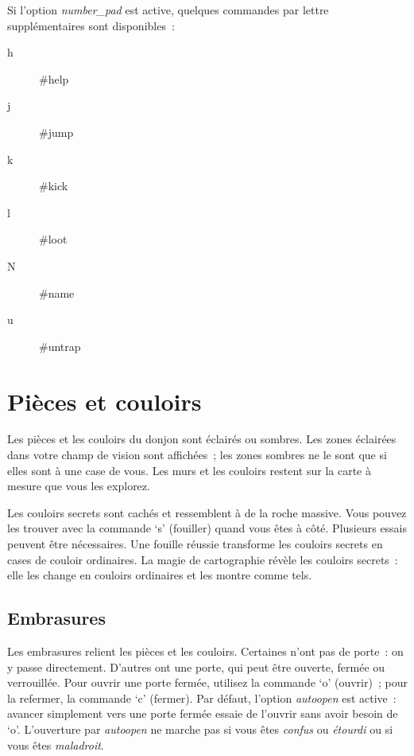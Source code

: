 \documentclass[titlepage]{article}
\begin{document}
Si l'option
\textit{number\_pad}
est active, quelques commandes par lettre supplémentaires sont
disponibles~:

\begin{description}
\item[{h}]
\#help

\item[{j}]
\#jump

\item[{k}]
\#kick

\item[{l}]
\#loot

\item[{N}]
\#name

\item[{u}]
\#untrap
\medskip

\end{description}
\section{Pièces et couloirs}



Les pièces et les couloirs du donjon sont éclairés ou sombres.
Les zones éclairées dans votre champ de vision sont affichées~; les zones
sombres ne le sont que si elles sont à une case de vous.
Les murs et les couloirs restent sur la carte à mesure que vous les
explorez.


Les couloirs secrets sont cachés et ressemblent à de la roche massive.
Vous pouvez les trouver avec la commande `s' (fouiller) quand vous
êtes à côté.
Plusieurs essais peuvent être nécessaires.
Une fouille réussie transforme les couloirs secrets en cases de couloir
ordinaires.
La magie de cartographie révèle les couloirs secrets~: elle les change en
couloirs ordinaires et les montre comme tels.

\subsection{Embrasures}



Les embrasures relient les pièces et les couloirs.
Certaines n'ont pas de porte~: on y passe directement.
D'autres ont une porte, qui peut être ouverte, fermée ou verrouillée.
Pour ouvrir une porte fermée, utilisez la commande `o' (ouvrir)~; pour
la refermer, la commande `c' (fermer).
Par défaut, l'option
\textit{autoopen}
est active~: avancer simplement vers une porte fermée essaie de l'ouvrir
sans avoir besoin de `o'.
L'ouverture par
\textit{autoopen}
ne marche pas si vous êtes \textit{confus} ou \textit{étourdi} ou si vous êtes
\textit{maladroit}.
\end{document}
